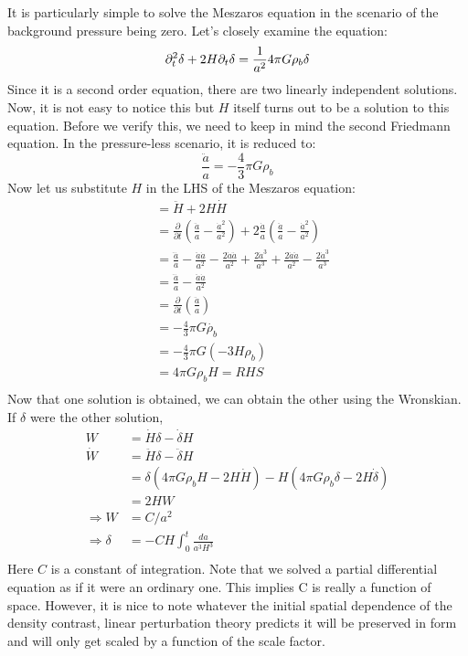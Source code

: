 \documentclass[12pt,a4paper,oneside]{book}
\def\pa{{\partial}}
\begin{document}
				It is particularly simple to solve the Meszaros equation in the scenario of the background pressure being zero. Let's closely examine the equation:
				$$
					\pa_t^2\delta+2H\pa_t\delta=\frac{1}{a^2}4\pi G\rho_b\delta\\
				$$
				Since it is a second order equation, there are two linearly independent solutions. Now, it is not easy to notice this but $H$ itself turns out to be a solution to this equation. Before we verify this, we need to keep in mind the second Friedmann equation. In the pressure-less scenario, it is reduced to:
				$$
					\frac{\ddot{a}}{a}=-\frac{4}{3}\pi G\rho_b
				$$
				Now let us substitute $H$ in the LHS of the Meszaros equation:
				$$
				\begin{aligned}
					&=\ddot{H}+2H\dot{H}\\
					&=\frac{\pa}{\pa t}\left(\frac{\ddot{a}}{a}-\frac{\dot{a}^2}{a^2}\right)+2\frac{\dot{a}}{a}\left(\frac{\ddot{a}}{a}-\frac{\dot{a}^2}{a^2}\right)\\
					&=\frac{\dddot{a}}{a}-\frac{\ddot{a}\dot{a}}{a^2}-\frac{2\dot{a}\ddot{a}}{a^2}+\frac{2\dot{a}^3}{a^3}+\frac{2\dot{a}\ddot{a}}{a^2}-\frac{2\dot{a}^3}{a^3}\\
					&=\frac{\dddot{a}}{a}-\frac{\ddot{a}\dot{a}}{a^2}\\
					&=\frac{\pa }{\pa t}\left(\frac{\ddot{a}}{a}\right)\\
					&=-\frac{4}{3}\pi G\dot{\rho_b}\\
					&=-\frac{4}{3}\pi G(-3H\rho_b)\\
					&=4\pi G \rho_b H=RHS\\
				\end{aligned}
				$$
				Now that one solution is obtained, we can obtain the other using the Wronskian. If $\delta$ were the other solution,
				$$
				\begin{aligned}
					W&=\dot{H}\delta-\dot{\delta}H\\
					\dot{W}&=\ddot{H}\delta-\ddot{\delta}H\\
					&=\delta(4\pi G\rho_bH-2H\dot{H})-H(4\pi G\rho_b\delta-2H\dot{\delta})\\
					&=2HW\\
					\Rightarrow W&=C/a^2\\
					\Rightarrow\delta&=-CH\int_{0}^{t}\frac{da}{a^3H^3}\\
				\end{aligned}
				$$
				Here $C$ is a constant of integration. Note that we solved a partial differential equation as if it were an ordinary one. This implies C is really a function of space. However, it is nice to note whatever the initial spatial dependence of the density contrast, linear perturbation theory predicts it will be preserved in form and will only get scaled by a function of the scale factor.
\end{document}
